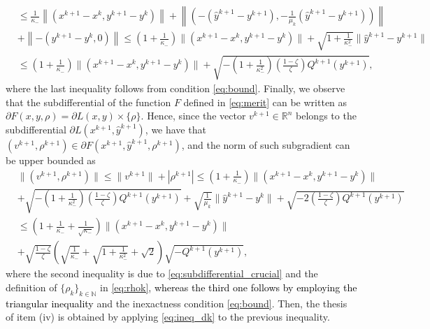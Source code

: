 \documentclass[pdflatex,sn-mathphys-num]{sn-jnl}
\numberwithin{equation}{section}%
\def\R{\mathbb{R}}
\def\N{\mathbb{N}}
\newcommand{\REV}[1]{\textcolor{black}{#1}}
\theoremstyle{thmstyleone}%
\theoremstyle{thmstyletwo}%
\theoremstyle{thmstylethree}%
\begin{document}
\begin{appendices}
\begin{align}
    &\le \frac{1}{\kappa_-} \left\|
                    \left(
                        x^{k+1} - x^{k},
                        y^{k+1} - y^{k}
                    \right) \right\| +\left\|
                    \left(
                        -(\hat y^{k+1} - y^{k+1}),
                        - \frac{1}{\mu_{k}} (\hat y^{k+1} - y^{k+1})
                    \right) \right\| \nonumber\\
    & + \left\|- \left( y^{k+1} - y^{k}, 0 \right)\right\|\leq \left(1+\frac{1}{\kappa_-}\right)\|(x^{k+1}-x^k,y^{k+1}-y^k)\|+\sqrt{1+\frac{1}{\kappa_-^2}}\|\hat{y}^{k+1}-y^{k+1}\|\nonumber\\
    &\leq \left(1+\frac{1}{\kappa_-}\right)\|(x^{k+1}-x^k,y^{k+1}-y^k)\|+\sqrt{-\left(1+\frac{1}{\kappa_-^2}\right)\left(\frac{1-\zeta}{\zeta}\right)Q^{k+1}(y^{k+1})},\label{eq:subdifferential_crucial}
\end{align}
where the last inequality follows from condition \eqref{eq:bound}. Finally, we observe that the subdifferential of the function $F$ defined in \eqref{eq:merit} can be written as $ \partial F(x,y,\rho) = \partial L(x,y) \times \{\rho\}$. Hence, since the vector $v^{k+1}\in\R^n$ belongs to the subdifferential $\partial L(x^{k+1},\hat{y}^{k+1})$, we have that $(v^{k+1},\rho^{k+1})\in\partial F(x^{k+1},\hat{y}^{k+1},\rho^{k+1})$, and the norm of such subgradient can be upper bounded as 
\begin{align*}
    &\|(v^{k+1},\rho^{k+1})\|\leq \|v^{k+1}\|+|\rho^{k+1}|\leq \left(1+\frac{1}{\kappa_-}\right)\|(x^{k+1}-x^k,y^{k+1}-y^k)\|\\
    &+\sqrt{-\left(1+\frac{1}{\kappa_-^2}\right)\left(\frac{1-\zeta}{\zeta}\right)Q^{k+1}(y^{k+1})}
    +\sqrt{\frac{1}{\mu_k}}\|\hat{y}^{k+1}-y^k\|+\sqrt{-2\left(\frac{1-\zeta}{\zeta}\right)Q^{k+1}(y^{k+1})}\\
    &\leq \left(1+\frac{1}{\kappa_-}+\frac{1}{\sqrt{\kappa_-}}\right)\|(x^{k+1}-x^k,y^{k+1}-y^k)\|\\
    &+\sqrt{\frac{1-\zeta}{\zeta}}\left(\sqrt{\frac{1}{\kappa_-}}+\sqrt{1+\frac{1}{\kappa_-^2}}+\sqrt{2}\right)\sqrt{-Q^{k+1}(y^{k+1})},
\end{align*}
where the second inequality is due to \eqref{eq:subdifferential_crucial} and the definition of $\{\rho_k\}_{k\in\N}$ in \eqref{eq:rhok}, \REV{whereas the third one follows by employing the triangular inequality} and the inexactness condition \eqref{eq:bound}. {Then, the thesis of item (iv) is obtained by applying \eqref{eq:ineq_dk} to the previous inequality.}


\end{appendices}
\end{document}
